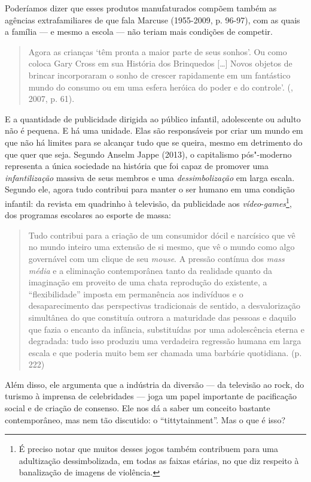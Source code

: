 {Poderíamos dizer que esses produtos manufaturados compõem também as
agências extrafamiliares de que fala Marcuse (1955-2009, p. 96-97), com
as quais a família --- e mesmo a escola --- não teriam mais condições de
competir.

\begin{quote}
Agora as crianças `têm pronta a maior parte de seus sonhos'. Ou como
coloca Gary Cross em sua História dos Brinquedos [\ldots{}] Novos objetos
de brincar incorporaram o sonho de crescer rapidamente em um fantástico
mundo do consumo ou em uma esfera heróica do poder e do controle'.
(, 2007, p. 61).
\end{quote}

E a quantidade de publicidade dirigida ao público infantil, adolescente
ou adulto não é pequena. E há uma unidade. Elas são responsáveis por
criar um mundo em que não há limites para se alcançar tudo que se
queira, mesmo em detrimento do que quer que seja. Segundo Anselm Jappe
(2013), o capitalismo pós"-moderno representa a única sociedade na
história que foi capaz de promover uma \emph{infantilização} massiva de
seus membros e uma \emph{dessimbolização} em larga escala. Segundo ele,
agora tudo contribui para manter o ser humano em uma condição infantil:
da revista em quadrinho à televisão, da publicidade aos
\emph{vídeo}-\emph{games}\footnote{É preciso notar que muitos desses
  jogos também contribuem para uma adultização dessimbolizada, em todas
  as faixas etárias, no que diz respeito à banalização de imagens de
  violência.}, dos programas escolares ao esporte de massa:

\begin{quote}
Tudo contribui para a criação de um consumidor dócil e narcísico que vê
no mundo inteiro uma extensão de si mesmo, que vê o mundo como algo
governável com um clique de seu \emph{mouse}. A pressão contínua dos
\emph{mass média} e a eliminação contemporânea tanto da realidade quanto
da imaginação em proveito de uma chata reprodução do existente, a
``flexibilidade'' imposta em permanência aos indivíduos e o
desaparecimento das perspectivas tradicionais de sentido, a
desvalorização simultânea do que constituía outrora a maturidade das
pessoas e daquilo que fazia o encanto da infância, substituídas por uma
adolescência eterna e degradada: tudo isso produziu uma verdadeira
regressão humana em larga escala e que poderia muito bem ser chamada uma
barbárie quotidiana. (p. 222)
\end{quote}

Além disso, ele argumenta que a indústria da diversão --- da televisão
ao rock, do turismo à imprensa de celebridades --- joga um papel
importante de pacificação social e de criação de consenso. Ele nos dá a
saber um conceito bastante contemporâneo, mas nem tão discutido: o
``tittytainment''. Mas o que é isso?

}
